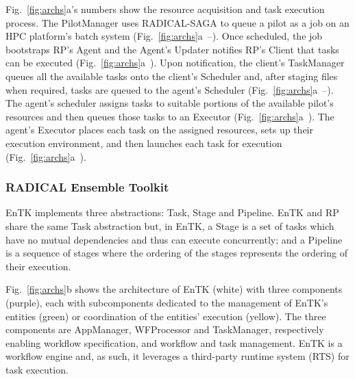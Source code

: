 \documentclass[preprint,12pt, a4paper]{elsarticle}
\begin{document}
Fig.~\ref{fig:archs}a's numbers show the resource acquisition and task execution
process. The PilotManager uses RADICAL-SAGA to queue a pilot as a job on an HPC
platform's batch system (Fig.~\ref{fig:archs}a~--). Once
scheduled, the job bootstraps RP's Agent and the Agent's Updater notifies RP's
Client that tasks can be executed (Fig.~\ref{fig:archs}a~). Upon
notification, the client's TaskManager queues all the available tasks onto the
client's Scheduler and, after staging files when required, tasks are queued to
the agent's Scheduler (Fig.~\ref{fig:archs}a~--). The
agent's scheduler assigns tasks to suitable portions of the available pilot's
resources and then queues those tasks to an Executor
(Fig.~\ref{fig:archs}a~). The agent's Executor places each task on
the assigned resources, sets up their execution environment, and then launches
each task for execution (Fig.~\ref{fig:archs}a~).


\subsubsection{RADICAL Ensemble Toolkit}\label{sssec:arch_entk}

EnTK implements three abstractions: Task, Stage and Pipeline. EnTK and RP share
the same Task abstraction but, in EnTK, a Stage is a set of tasks which have no
mutual dependencies and thus can execute concurrently; and a Pipeline is a
sequence of stages where the ordering of the stages represents the ordering of
their execution.


Fig.~\ref{fig:archs}b shows the architecture of EnTK (white) with three
components (purple), each with subcomponents dedicated to the management of
EnTK's entities (green) or coordination of the entities' execution (yellow). The
three components are AppManager, WFProcessor and TaskManager, respectively
enabling workflow specification, and workflow and task management. EnTK is a
workflow engine and, as such, it leverages a third-party runtime system (RTS)
for task execution.

\end{document}

